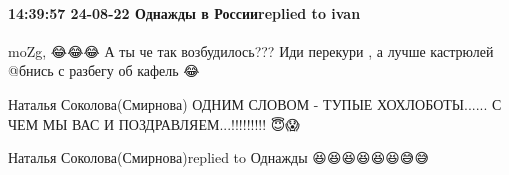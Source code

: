  
 
 
 
 

\paragraph{14:39:57 24-08-22 Однажды в Россииreplied to ivan}
moZg, 😂😂😂 А ты че так возбудилось??? Иди перекури , а лучше кастрюлей @бнись с разбегу об кафель 😂

Наталья Соколова(Смирнова)
ОДНИМ СЛОВОМ - ТУПЫЕ ХОХЛОБОТЫ...... С ЧЕМ МЫ ВАС И ПОЗДРАВЛЯЕМ...!!!!!!!!! 😇😱🤭🤭🤭

Наталья Соколова(Смирнова)replied to Однажды
😆😆😆😆😆😆😅😅
